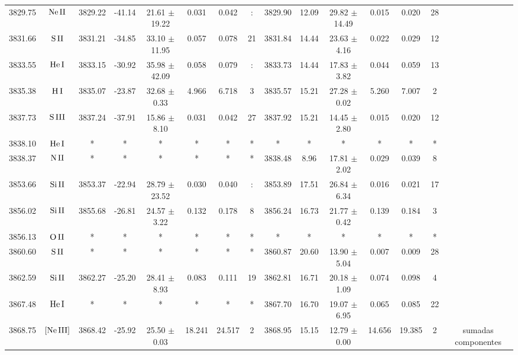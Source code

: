 \documentclass{article}
\begin{document}
\begin{table*}
\begin{adjustbox}{width=\textwidth}
\begin{tabular}{ccccccccccccccc}
3829.75 & $\mbox{Ne}\thinspace \mbox{II}$ & 3829.22 & -41.14 & 21.61 $\pm$ 19.22 & 0.031 & 0.042 & : & 3829.90 & 12.09 & 29.82 $\pm$ 14.49 & 0.015 & 0.020 & 28 &  \\
3831.66 & $\mbox{S}\thinspace \mbox{II}$ & 3831.21 & -34.85 & 33.10 $\pm$ 11.95 & 0.057 & 0.078 & 21 & 3831.84 & 14.44 & 23.63 $\pm$ 4.16 & 0.022 & 0.029 & 12 &  \\
3833.55 & $\mbox{He}\thinspace \mbox{I}$ & 3833.15 & -30.92 & 35.98 $\pm$ 42.09 & 0.058 & 0.079 & : & 3833.73 & 14.44 & 17.83 $\pm$ 3.82 & 0.044 & 0.059 & 13 &  \\
3835.38 & $\mbox{H}\thinspace \mbox{I}$ & 3835.07 & -23.87 & 32.68 $\pm$ 0.33 & 4.966 & 6.718 & 3 & 3835.57 & 15.21 & 27.28 $\pm$ 0.02 & 5.260 & 7.007 & 2 &  \\
3837.73 & $\mbox{S}\thinspace \mbox{III}$ & 3837.24 & -37.91 & 15.86 $\pm$ 8.10 & 0.031 & 0.042 & 27 & 3837.92 & 15.21 & 14.45 $\pm$ 2.80 & 0.015 & 0.020 & 12 &  \\
3838.10 & $\mbox{He}\thinspace \mbox{I}$ & * & * & * & * & * & * & * & * & * & * & * & * &  \\
3838.37 & $\mbox{N}\thinspace \mbox{II}$ & * & * & * & * & * & * & 3838.48 & 8.96 & 17.81 $\pm$ 2.02 & 0.029 & 0.039 & 8 &  \\
3853.66 & $\mbox{Si}\thinspace \mbox{II}$ & 3853.37 & -22.94 & 28.79 $\pm$ 23.52 & 0.030 & 0.040 & : & 3853.89 & 17.51 & 26.84 $\pm$ 6.34 & 0.016 & 0.021 & 17 &  \\
3856.02 & $\mbox{Si}\thinspace \mbox{II}$ & 3855.68 & -26.81 & 24.57 $\pm$ 3.22 & 0.132 & 0.178 & 8 & 3856.24 & 16.73 & 21.77 $\pm$ 0.42 & 0.139 & 0.184 & 3 &  \\
3856.13 & $\mbox{O}\thinspace \mbox{II}$ & * & * & * & * & * & * & * & * & * & * & * & * &  \\
3860.60 & $\mbox{S}\thinspace \mbox{II}$ & * & * & * & * & * & * & 3860.87 & 20.60 & 13.90 $\pm$ 5.04 & 0.007 & 0.009 & 28 &  \\
3862.59 & $\mbox{Si}\thinspace \mbox{II}$ & 3862.27 & -25.20 & 28.41 $\pm$ 8.93 & 0.083 & 0.111 & 19 & 3862.81 & 16.71 & 20.18 $\pm$ 1.09 & 0.074 & 0.098 & 4 &  \\
3867.48 & $\mbox{He}\thinspace \mbox{I}$ & * & * & * & * & * & * & 3867.70 & 16.70 & 19.07 $\pm$ 6.95 & 0.065 & 0.085 & 22 &  \\
3868.75 & $\mbox{[Ne}\thinspace \mbox{III]}$ & 3868.42 & -25.92 & 25.50 $\pm$ 0.03 & 18.241 & 24.517 & 2 & 3868.95 & 15.15 & 12.79 $\pm$ 0.00 & 14.656 & 19.385 & 2 &  sumadas componentes \\

\end{tabular}
\end{adjustbox}
\end{table*}
\end{document}
